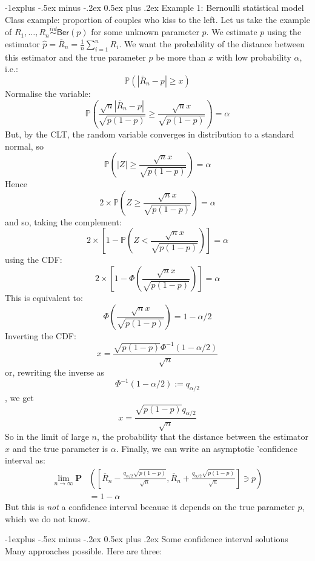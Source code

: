 \documentclass[10pt,landscape]{article}
\makeatletter
\renewcommand{\subsection}{\@startsection{subsection}{2}{0mm}%
                                {-1explus -.5ex minus -.2ex}%
                                {0.5ex plus .2ex}%
                                {\normalfont\normalsize\bfseries}}
\makeatother
\begin{document}
\begin{multicols*}{3}
\subsection{Example 1: Bernoulli statistical model}
Class example: proportion of couples who kiss to the left.\newline
Let us take the example of $R_1,\ldots ,R_ n\stackrel{iid}{\sim } \textsf{Ber}(p)$ for some unknown parameter $p$. We estimate $p$ using the estimator $\hat{p}=\overline{R}_ n=\frac{1}{n}\sum _{i=1}^{n} R_ i$.\newline
 We want the probability of the distance between this estimator and the true parameter $p$ be more than $x$ with low probability $\alpha$, i.e.:
$$\mathbb P(|\bar{R}_n-p|\ge x)$$
Normalise the variable:
$$\mathbb P\left(\frac{\sqrt{n} |\bar{R}_n-p|}{\sqrt{p(1-p)}}\ge \frac{\sqrt{n}x}{\sqrt{p(1-p)}}\right)=\alpha$$
But, by the CLT,  the random variable converges in distribution to a standard normal, so
$$\mathbb P\left(|Z|\ge \frac{\sqrt{n}x}{\sqrt{p(1-p)}}\right)=\alpha$$
Hence
$$2\times \mathbb P\left(Z\ge \frac{\sqrt{n}x}{\sqrt{p(1-p)}}\right)=\alpha$$
and so, taking the complement:
$$2\times \left[1-\mathbb P\left(Z< \frac{\sqrt{n}x}{\sqrt{p(1-p)}}\right) \right]=\alpha$$
using the CDF:
$$2\times\left[1-\Phi\left(\frac{\sqrt{n}x}{\sqrt{p(1-p)}}\right) \right]=\alpha$$
This is equivalent to:
$$\Phi\left(\frac{\sqrt{n}x}{\sqrt{p(1-p)}}\right) =1-\alpha/2$$
Inverting the CDF:
$$x=\frac{\sqrt{p(1-p)}\Phi^{-1}(1-\alpha/2)}{\sqrt{n}}$$
or, rewriting the inverse as
$$\Phi^{-1}(1-\alpha/2):=q_{\alpha/2}$$,
we get
$$x=\frac{\sqrt{p(1-p)}q_{\alpha/2}}{\sqrt{n}}$$
So in the limit of large $n$, the probability that the distance between the estimator $x$ and the true parameter is $\alpha$.
Finally, we can write an asymptotic  'confidence interval as:
\begin{align*}
\lim _{n\to \infty } \mathbf{P}&\left(\left[\overline{R}_ n-\frac{q_{\alpha /2}\sqrt{p(1-p)}}{\sqrt n},\overline{R}_ n+\frac{q_{\alpha /2}\sqrt{p(1-p)}}{\sqrt n}\right]\ni p\right)\\
 &= 1-\alpha
\end{align*}
But this is \emph{not} a confidence interval because it depends on the true parameter $p$, which we do not know.

\subsection{Some confidence interval solutions}
Many approaches possible. Here are three:

\end{multicols*}
\end{document}
